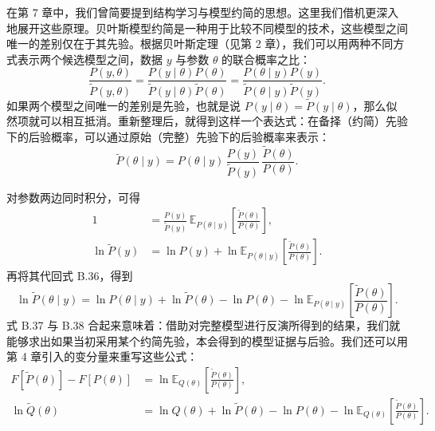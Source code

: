 在第 7 章中，我们曾简要提到结构学习与模型约简的思想。这里我们借机更深入地展开这些原理。贝叶斯模型约简是一种用于比较不同模型的技术，这些模型之间唯一的差别仅在于其先验。根据贝叶斯定理（见第 2 章），我们可以用两种不同方式表示两个候选模型之间，数据 $y$ 与参数 $\theta$ 的联合概率之比：
\begin{equation}
\frac{P(y,\theta)}{\tilde P(y,\theta)}
=
\frac{P(y\mid\theta)P(\theta)}{\tilde P(y\mid\theta)\tilde P(\theta)}
=
\frac{P(\theta\mid y)P(y)}{\tilde P(\theta\mid y)\tilde P(y)}.
\tag{B.35}
\end{equation}
如果两个模型之间唯一的差别是先验，也就是说 $P(y\mid\theta)=\tilde P(y\mid\theta)$，那么似然项就可以相互抵消。重新整理后，就得到这样一个表达式：在备择（约简）先验下的后验概率，可以通过原始（完整）先验下的后验概率来表示：
\begin{equation}
\tilde P(\theta \mid y)
=
P(\theta \mid y)\,
\frac{P(y)}{\tilde P(y)}\,
\frac{\tilde P(\theta)}{P(\theta)}.
\tag{B.36}
\end{equation}

对参数两边同时积分，可得
\begin{align}
1
&=
\frac{P(y)}{\tilde P(y)}
\,
\mathbb{E}_{P(\theta\mid y)}
\!\left[
\frac{\tilde P(\theta)}{P(\theta)}
\right],
\nonumber\\
\ln \tilde P(y)
&=
\ln P(y)
+ \ln
\mathbb{E}_{P(\theta\mid y)}
\!\left[
\frac{\tilde P(\theta)}{P(\theta)}
\right].
\tag{B.37}
\end{align}
再将其代回式 B.36，得到
\begin{equation}
\ln \tilde P(\theta \mid y)
=
\ln P(\theta \mid y)
+ \ln \tilde P(\theta)
- \ln P(\theta)
- \ln
\mathbb{E}_{P(\theta\mid y)}
\!\left[
\frac{\tilde P(\theta)}{P(\theta)}
\right].
\tag{B.38}
\end{equation}
式 B.37 与 B.38 合起来意味着：借助对完整模型进行反演所得到的结果，我们就能够求出如果当初采用某个约简先验，本会得到的模型证据与后验。我们还可以用第 4 章引入的变分量来重写这些公式：
\begin{align}
F[\tilde P(\theta)] - F[P(\theta)]
&=
\ln
\mathbb{E}_{Q(\theta)}
\!\left[
\frac{\tilde P(\theta)}{P(\theta)}
\right],
\nonumber\\
\ln \tilde Q(\theta)
&=
\ln Q(\theta)
+ \ln \tilde P(\theta)
- \ln P(\theta)
- \ln
\mathbb{E}_{Q(\theta)}
\!\left[
\frac{\tilde P(\theta)}{P(\theta)}
\right].
\tag{B.39}
\end{align}

